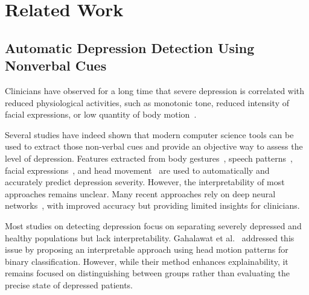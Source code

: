 \section{Related Work}

\subsection{Automatic Depression Detection Using Nonverbal Cues}

Clinicians have observed for a long time that severe depression is correlated with reduced physiological activities, such as monotonic tone, reduced intensity of facial expressions, or low quantity of body motion~\cite{american2013diagnostic}.  

Several studies have indeed shown that modern computer science tools can be used to extract those non-verbal cues and provide an objective way to assess the level of depression. Features extracted from body gestures~\cite{joshi2013can}, speech patterns~\cite{cummins2015review}, facial expressions~\cite{dibekliouglu2017dynamic}, and head movement~\cite{KacemIEEEFG2018} are used to automatically and accurately predict depression severity.
However, the interpretability of most approaches remains unclear. Many recent approaches rely on deep neural networks~\cite{song2018human, suhara2017deepmood}, with improved accuracy but providing limited insights for clinicians.

Most studies on detecting depression focus on separating severely depressed and healthy populations but lack interpretability. Gahalawat et al.~\cite{GahalawatDep} addressed this issue by proposing an interpretable approach using head motion patterns for binary classification. However, while their method enhances explainability, it remains focused on distinguishing between groups rather than evaluating the precise state of depressed patients.

